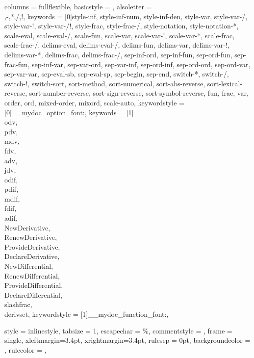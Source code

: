 {
	columns = fullflexible,
	basicstyle = \ttfamily\upshape\small,
	alsoletter =  {\\,-,*,/,!},
	keywords = [0]{style-inf, style-inf-num, style-inf-den, style-var, style-var-/, style-var-!, style-var-/!, style-frac, style-frac-/, style-notation, style-notation-*, scale-eval, scale-eval-/, scale-fun, scale-var, scale-var-!, scale-var-*, scale-frac, scale-frac-/, delims-eval, delims-eval-/, delims-fun, delims-var, delims-var-!, delims-var-*, delims-frac, delims-frac-/, sep-inf-ord, sep-inf-fun, sep-ord-fun, sep-frac-fun, sep-inf-var, sep-var-ord, sep-var-inf, sep-ord-inf, sep-ord-ord, sep-ord-var, sep-var-var, sep-eval-sb, sep-eval-sp, sep-begin, sep-end, switch-*, switch-/, switch-!, switch-sort, sort-method, sort-numerical, sort-abs-reverse, sort-lexical-reverse, sort-number-reverse, sort-sign-reverse, sort-symbol-reverse, fun, frac, var, order, ord, mixed-order, mixord, scale-auto},
	keywordstyle = [0]\__mydoc_option_font:,
	keywords = [1]{\\odv, \\pdv, \\mdv, \\fdv, \\adv, \\jdv, \\odif, \\pdif, \\mdif, \\fdif, \\adif, \\NewDerivative, \\RenewDerivative, \\ProvideDerivative, \\DeclareDerivative, \\NewDifferential, \\RenewDifferential, \\ProvideDifferential, \\DeclareDifferential, \\slashfrac, \\derivset},
	keywordstyle = [1]\__mydoc_function_font:,
}

{
	style = inlinestyle,
	tabsize = 1,
	escapechar = \%,
	commentstyle = \footnotesize,
	frame = single,
	xleftmargin=3.4pt,
	xrightmargin=3.4pt,
	rulesep = 0pt,
	backgroundcolor = \color{RoyalLightGray},
	rulecolor = \color{RoyalGray},
}


